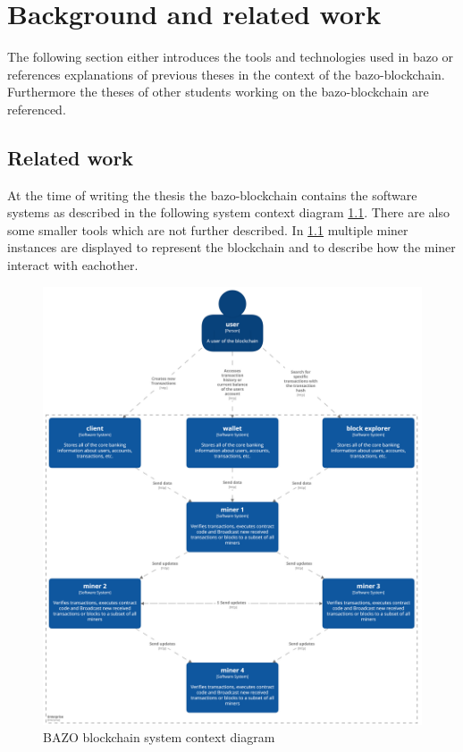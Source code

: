 \chapter{Background and related work}
\thispagestyle{main} %
The following section either introduces the tools and technologies used in bazo or references explanations of previous theses in the context of the bazo-blockchain. Furthermore the theses of other students working on the bazo-blockchain are referenced.
\pagebreak

\section{Related work}
At the time of writing the thesis the bazo-blockchain contains the software systems as described in the following system context diagram \ref{systemcontextdiagram}. There are also some smaller tools which are not further described. In \ref{systemcontextdiagram} multiple miner instances are displayed to represent the blockchain and to describe how the miner interact with eachother.

\vfill

\begin{figure}[H]
	\begin{center}
	\includegraphics[width=\textwidth]{./images/BAZO_System_Context}
	\caption{BAZO blockchain system context diagram}
	\label{systemcontextdiagram}
	\end{center}
\end{figure}
\pagebreak

